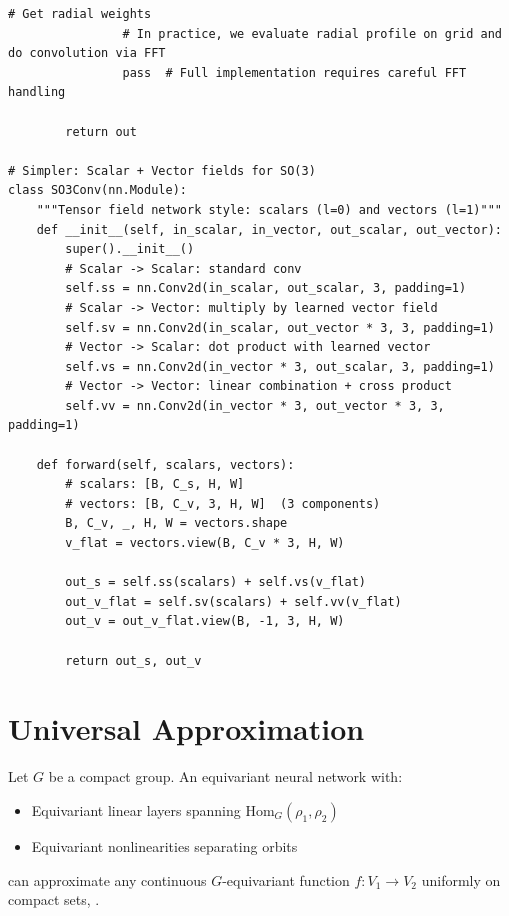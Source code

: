 \begin{lstlisting}[style=python,caption=SO(2)-equivariant convolution using steerable filters]
                # Get radial weights
                # In practice, we evaluate radial profile on grid and do convolution via FFT
                pass  # Full implementation requires careful FFT handling
        
        return out

# Simpler: Scalar + Vector fields for SO(3)
class SO3Conv(nn.Module):
    """Tensor field network style: scalars (l=0) and vectors (l=1)"""
    def __init__(self, in_scalar, in_vector, out_scalar, out_vector):
        super().__init__()
        # Scalar -> Scalar: standard conv
        self.ss = nn.Conv2d(in_scalar, out_scalar, 3, padding=1)
        # Scalar -> Vector: multiply by learned vector field
        self.sv = nn.Conv2d(in_scalar, out_vector * 3, 3, padding=1)
        # Vector -> Scalar: dot product with learned vector
        self.vs = nn.Conv2d(in_vector * 3, out_scalar, 3, padding=1)
        # Vector -> Vector: linear combination + cross product
        self.vv = nn.Conv2d(in_vector * 3, out_vector * 3, 3, padding=1)
    
    def forward(self, scalars, vectors):
        # scalars: [B, C_s, H, W]
        # vectors: [B, C_v, 3, H, W]  (3 components)
        B, C_v, _, H, W = vectors.shape
        v_flat = vectors.view(B, C_v * 3, H, W)
        
        out_s = self.ss(scalars) + self.vs(v_flat)
        out_v_flat = self.sv(scalars) + self.vv(v_flat)
        out_v = out_v_flat.view(B, -1, 3, H, W)
        
        return out_s, out_v
\end{lstlisting}

\section{Universal Approximation}
\label{sec:eq:univ}

\begin{theorem}
Let $G$ be a compact group. An equivariant neural network with: \cite{lim2023equivariant}
\begin{itemize}
    \item Equivariant linear layers spanning $\mathrm{Hom}_G(\rho_1, \rho_2)$
    \item Equivariant nonlinearities separating orbits
\end{itemize}
can approximate any continuous $G$-equivariant function $f: V_1 \to V_2$ uniformly on compact sets, \cite{lim2023equivariant}.
\end{theorem}

